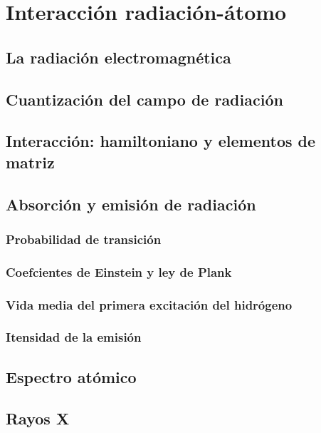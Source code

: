 \chapter{Interacción radiación-átomo}
\section{La radiación electromagnética}

\section{Cuantización del campo de radiación}

\section{Interacción: hamiltoniano y elementos de matriz}

\section{Absorción y emisión de radiación}

\subsection{Probabilidad de transición}

\subsection{Coefcientes de Einstein y ley de Plank}

\subsection{Vida media del primera excitación del hidrógeno}

\subsection{Itensidad de la emisión}

\section{Espectro atómico}

\section{Rayos X}





